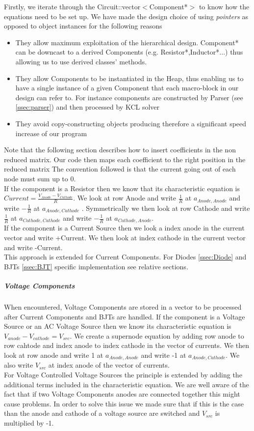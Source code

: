 \documentclass{article}
\begin{document}
Firstly, we iterate through the Circuit::vector$<$Component*$>$ to know how the equations need to be set up. We have made the design choice of using \textit{pointers} as opposed to object instances for the following reasons
\begin{itemize}
  \item They allow maximum exploitation of the hierarchical design. Component* can be downcast to a derived Components (e.g. Resistor*,Inductor*...) thus allowing us to use derived classes' methods.
  \item They allow Components to be instantiated in the Heap, thus enabling us to have a single instance of a given Component that each macro-block in our design can refer to. For instance components are constructed by Parser (see \ref{ssec:parser}) and then processed by KCL solver
  \item They avoid copy-constructing objects producing therefore a significant speed increase of our program
\end{itemize}

Note that the following section describes how to insert coefficients in the non reduced matrix. Our code then maps each coefficient to the right position in the reduced matrix\bigbreak
The convention followed is that the current going out of each node must sum up to 0.\\
If the component is a Resistor then we know that its characteristic equation is $Current = \frac{V_{Anode} - V_{Cathode}}{R}$. We look at row Anode and write $\frac{1}{R}$ at $a_{Anode,Anode}$  and write $-\frac{1}{R}$ at $a_{Anode,Cathode}$ . Symmetrically we then look at row Cathode and write $\frac{1}{R}$ at $a_{Cathode,Cathode}$  and write $-\frac{1}{R}$ at $a_{Cathode,Anode}$.\\
If the component is a Current Source then we look a index anode in the current vector and write +Current. We then look at index cathode in the current vector and write -Current.\\
This approach is extended for Current Components. For Diodes \ref{ssec:Diode} and BJTs \ref{ssec:BJT} specific implementation see relative sections.

\subparagraph{Voltage Components}
When encountered, Voltage Components are stored in a vector to be processed after Current Components and BJTs are handled.\bigbreak
If the component is a Voltage Source or an AC Voltage Source then we know its characteristic equation is $V_{anode}-V_{cathode}=V_{src}$. We create a supernode equation by adding row anode to row cahtode and index anode to index cathode in the vector of currents. We then look at row anode and write 1 at $a_{Anode,Anode}$ and write -1 at $a_{Anode,Cathode}$. We also write $V_{src}$ at index anode of the vector of currents.\\ For Voltage Controlled Voltage Sources the principle is extended by adding the additional terms included in the characteristic equation.\bigbreak
We are well aware of the fact that if two Voltage Components anodes are connected together this might cause problems. In order to solve this issue we made sure that if this is the case than the anode and cathode of a voltage source are switched and $V_{src}$ is multiplied by -1.
\end{document}
